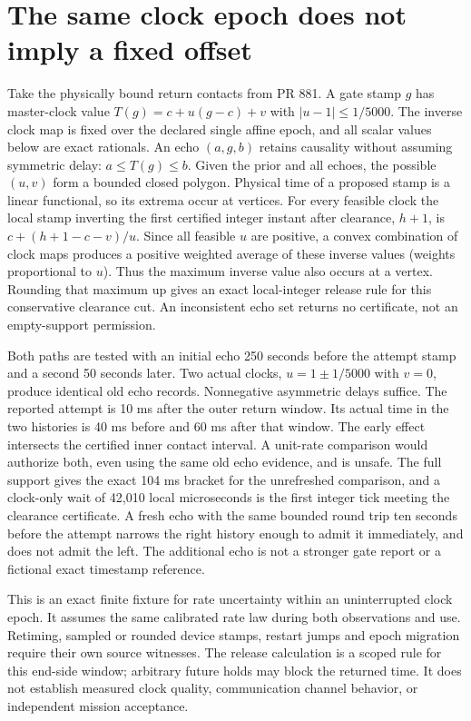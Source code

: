 \documentclass{article}
\begin{document}
\section*{The same clock epoch does not imply a fixed offset}
Take the physically bound return contacts from PR 881. A gate
stamp $g$ has master-clock value $T(g)=c+u(g-c)+v$ with
$|u-1|\le 1/5000$. The inverse clock map is fixed over the
declared single affine epoch, and all scalar values below are exact
rationals. An echo $(a,g,b)$ retains causality without assuming
symmetric delay: $a\le T(g)\le b$. Given the prior and all
echoes, the possible $(u,v)$ form a bounded closed polygon.
Physical time of a proposed stamp is a linear functional, so its
extrema occur at vertices. For every feasible clock the local stamp
inverting the first certified integer instant after clearance, $h+1$,
is $c+(h+1-c-v)/u$. Since all feasible $u$ are positive, a convex
combination of clock maps produces a positive weighted average of
these inverse values (weights proportional to $u$).
Thus the maximum inverse value also occurs at a vertex.
Rounding that maximum up gives an exact local-integer release rule
for this conservative clearance cut. An inconsistent echo set
returns no certificate, not an empty-support permission.

Both paths are tested with an initial echo 250 seconds before the
attempt stamp and a second 50 seconds later. Two actual clocks,
$u=1\pm1/5000$ with $v=0$, produce identical old echo records.
Nonnegative asymmetric delays suffice. The reported attempt is
10 ms after the outer return window. Its actual time in the two
histories is 40 ms before and 60 ms after that window. The early
effect intersects the certified inner contact interval. A
unit-rate comparison would authorize both, even using the same old
echo evidence, and is unsafe. The full support gives the exact
104 ms bracket for the unrefreshed comparison, and a clock-only
wait of 42,010 local microseconds is the first integer tick meeting
the clearance certificate. A fresh echo with the same bounded
round trip ten seconds before the attempt narrows the right
history enough to admit it immediately, and does not admit the
left. The additional echo is not a stronger gate report or a
fictional exact timestamp reference.

This is an exact finite fixture for rate uncertainty within an
uninterrupted clock epoch. It assumes the same calibrated rate law
during both observations and use. Retiming, sampled or rounded device
stamps, restart jumps and epoch migration require their own source
witnesses. The release calculation is a scoped rule for this end-side
window; arbitrary future holds may block the returned time. It does
not establish measured clock quality, communication channel behavior,
or independent mission acceptance.
\end{document}
